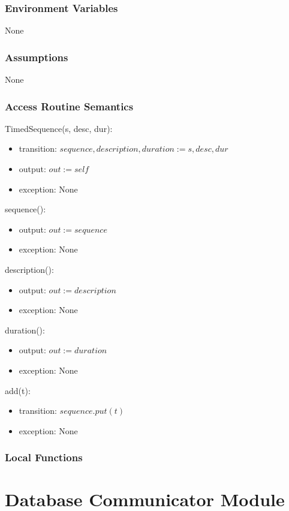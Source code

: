 \documentclass[12pt, titlepage]{article}
\begin{document}
\subsubsection{Environment Variables}
None
\subsubsection{Assumptions}
None
\subsubsection{Access Routine Semantics}

TimedSequence(s, desc, dur):
\begin{itemize}
	\item transition: $sequence, description, duration := s, desc, dur$
	\item output: $out := self$
	\item exception: None
\end{itemize}

sequence():
\begin{itemize}
	\item output: $out := sequence$
	\item exception: None
\end{itemize}

description():
\begin{itemize}
	\item output: $out := description$
	\item exception: None
\end{itemize}

duration():
\begin{itemize}
	\item output: $out := duration$
	\item exception: None
\end{itemize}

add(t):
\begin{itemize}
	\item transition: $sequence.put(t)$
	\item exception: None
\end{itemize}

\subsubsection{Local Functions}

\newpage

\section{Database Communicator Module}
\end{document}
